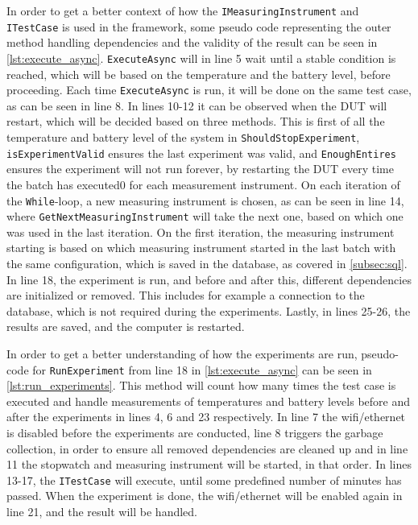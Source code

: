 In order to get a better context of how the \texttt{IMeasuringInstrument} and \texttt{ITestCase} is used in the framework, some pseudo code representing the outer method handling dependencies and the validity of the result can be seen in \cref*{lst:execute_async}. \texttt{ExecuteAsync} will in line 5 wait until a stable condition is reached, which will be based on the temperature and the battery level, before proceeding. Each time \texttt{ExecuteAsync} is run, it will be done on the same test case, as can be seen in line 8. In lines 10-12 it can be observed when the DUT will restart, which will be decided based on three methods. This is first of all the temperature and battery level of the system in \texttt{ShouldStopExperiment}, \texttt{isExperimentValid} ensures the last experiment was valid, and \texttt{EnoughEntires} ensures the experiment will not run forever, by restarting the DUT every time the batch has executed0 for each measurement instrument. On each iteration of the \texttt{While}-loop, a new measuring instrument is chosen, as can be seen in line 14, where \texttt{GetNextMeasuringInstrument} will take the next one, based on which one was used in the last iteration. On the first iteration, the measuring instrument starting is based on which measuring instrument started in the last batch with the same configuration, which is saved in the database, as covered in \cref{subsec:sql}. In line 18, the experiment is run, and before and after this, different dependencies are initialized or removed. This includes for example a connection to the database, which is not required during the experiments. Lastly, in lines 25-26, the results are saved, and the computer is restarted. 



In order to get a better understanding of how the experiments are run, pseudo-code for \texttt{RunExperiment} from line 18 in \cref{lst:execute_async} can be seen in \cref{lst:run_experiments}. This method will count how many times the test case is executed and handle measurements of temperatures and battery levels before and after the experiments in lines 4, 6 and 23 respectively. In line 7 the wifi/ethernet is disabled before the experiments are conducted, line 8 triggers the garbage collection, in order to ensure all removed dependencies are cleaned up and in line 11 the stopwatch and measuring instrument will be started, in that order. In lines 13-17, the \texttt{ITestCase} will execute, until some predefined number of minutes has passed. When the experiment is done, the wifi/ethernet will be enabled again in line 21, and the result will be handled.





